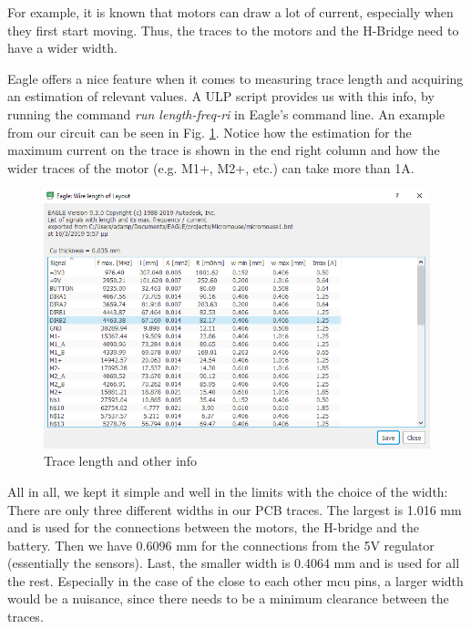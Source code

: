For example, it is known that motors can draw a lot of current, especially when they first start moving. Thus, the traces to the motors and the H-Bridge need to have a wider width.

Eagle offers a nice feature when it comes to measuring trace length and acquiring an estimation of relevant values. A ULP script provides us with this info, by running the command \textit{run length-freq-ri} in Eagle's command line. An example from our circuit can be seen in Fig. \ref{fig:length}. Notice how the estimation for the maximum current on the trace is shown in the end right column and how the wider traces of the motor (e.g. M1+, M2+, etc.) can take more than 1A.

\begin{figure}[H]
    \centering
    \includegraphics[width=1\textwidth]{figures/hardware/ULP.PNG}
    \caption{Trace length and other info}
    \label{fig:length}
\end{figure}

\noindent
All in all, we kept it simple and well in the limits with  the choice of the width: There are only three different widths in our PCB traces. The largest is 1.016 mm and is used for the connections between the motors, the H-bridge and the battery. Then we have 0.6096 mm for the connections from the 5V regulator (essentially the sensors). Last, the smaller width is 0.4064 mm and is used for all the rest. Especially in the case of the close to each other mcu pins, a larger width would be a nuisance, since there needs to be a minimum clearance between the traces.

\vspace{1cm}

